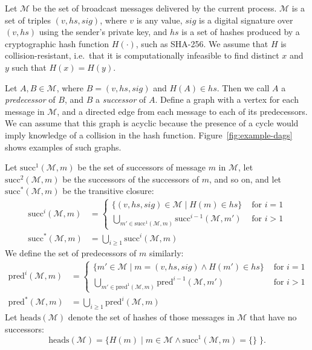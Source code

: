 \documentclass[a4paper,anonymous,USenglish]{lipics-v2019}
\begin{document}
Let $\mathcal{M}$ be the set of broadcast messages delivered by the current process.
$\mathcal{M}$ is a set of triples $(v, \mathit{hs}, \mathit{sig})$, where $v$ is any value, $\mathit{sig}$ is a digital signature over $(v, \mathit{hs})$ using the sender's private key, and $\mathit{hs}$ is a set of hashes produced by a cryptographic hash function $H(\cdot)$, such as SHA-256.
We assume that $H$ is collision-resistant, i.e.\ that it is computationally infeasible to find distinct $x$ and $y$ such that $H(x) = H(y)$.

Let $A, B \in \mathcal{M}$, where $B = (v, \mathit{hs}, \mathit{sig})$ and $H(A) \in \mathit{hs}$.
Then we call $A$ a \emph{predecessor} of $B$, and $B$ a \emph{successor} of $A$.
Define a graph with a vertex for each message in $\mathcal{M}$, and a directed edge from each message to each of its predecessors.
We can assume that this graph is acyclic because the presence of a cycle would imply knowledge of a collision in the hash function.
Figure~\ref{fig:example-dags} shows examples of such graphs.

Let $\mathrm{succ}^1(\mathcal{M}, m)$ be the set of successors of message $m$ in $\mathcal{M}$, let $\mathrm{succ}^2(\mathcal{M}, m)$ be the successors of the successors of $m$, and so on, and let $\mathrm{succ}^*(\mathcal{M}, m)$ be the transitive closure:
\begin{align*}
\mathrm{succ}^i(\mathcal{M}, m) &=
\begin{cases}
\{(v, \mathit{hs}, \mathit{sig}) \in \mathcal{M} \mid H(m) \in \mathit{hs}\} & \text{ for } i=1 \\
\bigcup_{m' \in \mathrm{succ}^1(\mathcal{M}, m)} \mathrm{succ}^{i-1}(\mathcal{M}, m') & \text{ for } i>1
\end{cases} \\
\mathrm{succ}^*(\mathcal{M}, m) &= \bigcup_{i \ge 1} \mathrm{succ}^i(\mathcal{M}, m)
\end{align*}
We define the set of predecessors of $m$ similarly:
\begin{align*}
\mathrm{pred}^i(\mathcal{M}, m) &=
\begin{cases}
\{ m' \in \mathcal{M} \mid m = (v, \mathit{hs}, \mathit{sig}) \wedge H(m') \in \mathit{hs}\} & \text{ for } i=1 \\
\bigcup_{m' \in \mathrm{pred}^1(\mathcal{M}, m)} \mathrm{pred}^{i-1}(\mathcal{M}, m') & \text{ for } i>1
\end{cases} \\
\mathrm{pred}^*(\mathcal{M}, m) &= \bigcup_{i \ge 1} \mathrm{pred}^i(\mathcal{M}, m)
\end{align*}
Let $\mathrm{heads}(\mathcal{M})$ denote the set of hashes of those messages in $\mathcal{M}$ that have no successors:
\[ \mathrm{heads}(\mathcal{M}) = \{H(m) \mid m \in \mathcal{M} \wedge \mathrm{succ}^1(\mathcal{M}, m) = \{\}\;\}. \]
\end{document}
